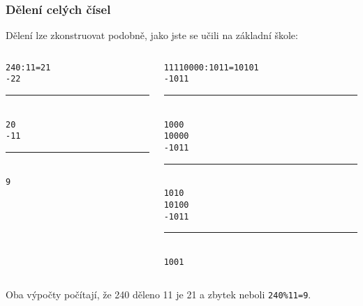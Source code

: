 \documentclass{beamer}
\begin{document}
\begin{frame}
\frametitle{Dělení celých čísel}

Dělení lze zkonstruovat podobně, jako jste se učili na základní škole:
\bigskip
\begin{columns}
\begin{column}{0.4\textwidth}
\texttt{\phantom{-}240:11=21}\\
\texttt{-22}\\
\vspace{-8pt}
\rule[0pt]{1cm}{0.1pt}\\
\texttt{\phantom{xx}20}\\
\texttt{\phantom{x}-11}\\
\vspace{-8pt}
\rule[0pt]{1cm}{0.1pt}\\
\texttt{\phantom{xxx}9}\\
\end{column}
\hfill
\begin{column}{0.4\textwidth}
\texttt{\phantom{x}11110000:1011=10101}\\
\texttt{-1011}\\
\vspace{-8pt}
\rule[0pt]{1cm}{0.4pt}\\
\texttt{\phantom{xx}1000}\\
\texttt{\phantom{xx}10000}\\
\texttt{\phantom{xx}-1011}\\
\vspace{-8pt}
\rule[0pt]{1.4cm}{0.4pt}\\
\texttt{\phantom{xxxx}1010}\\
\texttt{\phantom{xxxx}10100}\\
\texttt{\phantom{xxxx}-1011}\\
\vspace{-8pt}
\rule[0pt]{1.8cm}{0.4pt}\\
\texttt{\phantom{xxxxx}1001}\\
\end{column}
\end{columns}
\bigskip
Oba výpočty počítají, že 240 děleno 11 je 21 a zbytek neboli \texttt{240\%11=9}.

\end{frame}
\end{document}
